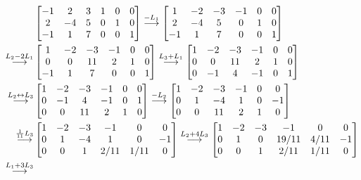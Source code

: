 \documentclass[12pt,a4paper]{article}
\newcommand{\grstep}[2][\relax]{%
   \ensuremath{\mathrel{
       {\mathop{\longrightarrow}\limits^{#2\mathstrut}_{
                                     \begin{subarray}{l} #1 \end{subarray}}}}}}
\newcommand{\swap}{\leftrightarrow}
\begin{document}
\begin{enumerate}
\begin{align*}
&
\begin{bmatrix}
-1 &  2 & 3 & 1 & 0 & 0\\
 2 & -4 & 5 & 0 & 1 & 0\\
-1 &  1 & 7 & 0 & 0 & 1
\end{bmatrix}
\grstep{ -L_1 }
\begin{bmatrix}
 1 & -2 & -3 & -1 & 0 & 0\\
 2 & -4 &  5 &  0 & 1 & 0\\
-1 &  1 &  7 &  0 & 0 & 1
\end{bmatrix} \\
\grstep{ L_2 - 2 L_1 }
& \begin{bmatrix}
 1 & -2 & -3 & -1 & 0 & 0\\
 0 &  0 & 11 &  2 & 1 & 0\\
-1 &  1 &  7 &  0 & 0 & 1
\end{bmatrix}
\grstep{ L_3 + L_1 }
\begin{bmatrix}
 1 & -2 & -3 & -1 & 0 & 0\\
 0 &  0 & 11 &  2 & 1 & 0\\
 0 & -1 &  4 & -1 & 0 & 1
\end{bmatrix} \\
\grstep{ L_2 \swap L_3 }
& \begin{bmatrix}
 1 & -2 & -3 & -1 & 0 & 0\\
 0 & -1 &  4 & -1 & 0 & 1\\
 0 &  0 & 11 &  2 & 1 & 0
\end{bmatrix}
\grstep{ -L_2 }
\begin{bmatrix}
 1 & -2 & -3 & -1 & 0 &  0\\
 0 &  1 & -4 &  1 & 0 & -1\\
 0 &  0 & 11 &  2 & 1 &  0
\end{bmatrix} \\
\grstep{ \frac{1}{11} L_3 }
&
\begin{bmatrix}
 1 & -2 & -3 & -1 & 0 &  0\\
 0 &  1 & -4 &  1 & 0 & -1\\
 0 &  0 &  1 & 2/11 & 1/11 &  0
\end{bmatrix}
\grstep{ L_2 +4 L_3 }
\begin{bmatrix}
 1 & -2 & -3 & -1 & 0 &  0\\
 0 &  1 &  0 & 19/11 & 4/11 & -1\\
 0 &  0 &  1 & 2/11 & 1/11 &  0
\end{bmatrix} \\
\grstep{ L_1 + 3 L_3 }

\end{align*}
\end{enumerate}
\end{document}
